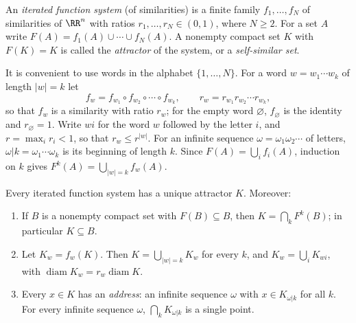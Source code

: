 \begin{definition}\label{geometric-measure-theory:definition-ifs}
An \emph{iterated function system} (of similarities) is a finite family $f_1, \ldots, f_N$ of similarities of $\RR^n$ with ratios $r_1, \ldots, r_N \in (0, 1)$, where $N \geq 2$. For a set $A$ write
$F(A) = f_1(A) \cup \cdots \cup f_N(A)$. A nonempty compact set $K$ with $F(K) = K$ is called the \emph{attractor} of the system, or a \emph{self-similar set}.
\end{definition}

It is convenient to use words in the alphabet $\{1, \ldots, N\}$. For a word $w = w_1 \cdots w_k$ of length $|w| = k$ let
\[
f_w = f_{w_1} \circ f_{w_2} \circ \cdots \circ f_{w_k}, \qquad r_w = r_{w_1}r_{w_2} \cdots r_{w_k},
\]
so that $f_w$ is a similarity with ratio $r_w$; for the empty word $\varnothing$, $f_\varnothing$ is the identity and $r_\varnothing = 1$. Write $wi$ for the word $w$ followed by the letter $i$, and
$r = \max_ir_i < 1$, so that $r_w \leq r^{|w|}$. For an infinite sequence $\omega = \omega_1\omega_2\cdots$ of letters, $\omega|k = \omega_1 \cdots \omega_k$ is its beginning of length $k$. Since
$F(A) = \bigcup_if_i(A)$, induction on $k$ gives $F^k(A) = \bigcup_{|w| = k}f_w(A)$.

\begin{theorem}[Hutchinson]\label{geometric-measure-theory:theorem-hutchinson}
Every iterated function system has a unique attractor $K$. Moreover:
\begin{enumerate}
\item If $B$ is a nonempty compact set with $F(B) \subseteq B$, then $K = \bigcap_kF^k(B)$; in particular $K \subseteq B$.
\item Let $K_w = f_w(K)$. Then $K = \bigcup_{|w| = k}K_w$ for every $k$, and $K_w = \bigcup_iK_{wi}$, with $\operatorname{diam}K_w = r_w\operatorname{diam}K$.
\item Every $x \in K$ has an \emph{address}: an infinite sequence $\omega$ with $x \in K_{\omega|k}$ for all $k$. For every infinite sequence $\omega$, $\bigcap_kK_{\omega|k}$ is a single point.
\end{enumerate}
\end{theorem}

